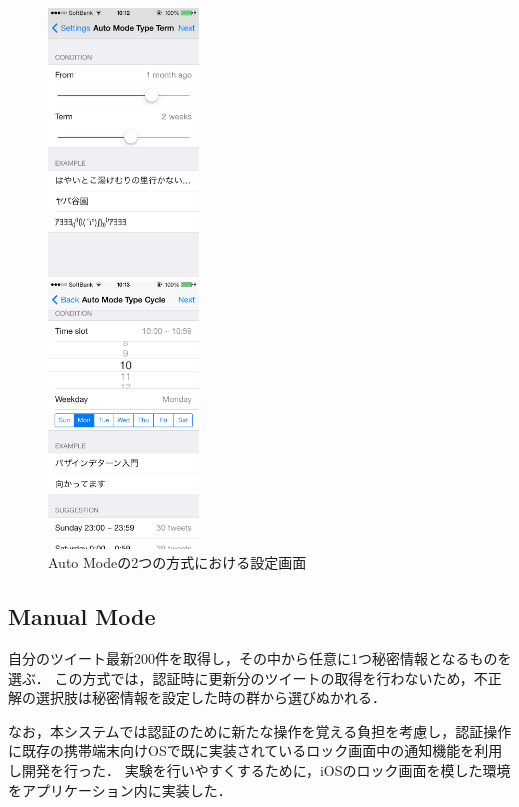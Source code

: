 \documentclass[twocolumn, a4paper, 9pt]{UECIEresume}
\begin{document}
\begin{figure}[ht]
  \begin{minipage}{0.49\hsize}
    \begin{center}
      \includegraphics[width=40mm]{img/notifauthAutoTerm.eps}
    \end{center}
  \end{minipage}
  \begin{minipage}{0.49\hsize}
    \begin{center}
      \includegraphics[width=40mm]{img/notifauthAutoCycle.eps}
    \end{center}
  \end{minipage}
  \caption{Auto Modeの2つの方式における設定画面}
  \label{notifauthSettings}
\end{figure}

\subsection{Manual Mode}
自分のツイート最新200件を取得し，その中から任意に1つ秘密情報となるものを選ぶ．
この方式では，認証時に更新分のツイートの取得を行わないため，不正解の選択肢は秘密情報を設定した時の群から選びぬかれる．
\\
\par
なお，本システムでは認証のために新たな操作を覚える負担を考慮し，認証操作に既存の携帯端末向けOSで既に実装されているロック画面中の通知機能を利用し開発を行った．
実験を行いやすくするために，iOSのロック画面を模した環境をアプリケーション内に実装した．
\end{document}

